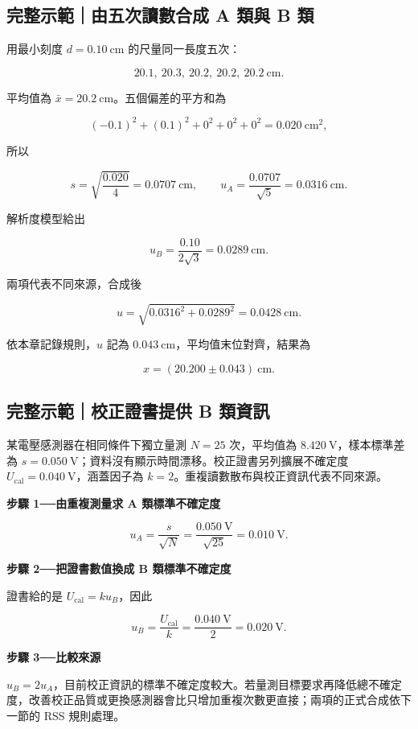 \documentclass[11pt,a4paper]{article}
\begin{document}
\begin{HandoutWorkedExample}

\subsection{完整示範｜由五次讀數合成 A 類與 B 類}\label{ux5b8cux6574ux793aux7bc4ux7531ux4e94ux6b21ux8b80ux6578ux5408ux6210-a-ux985eux8207-b-ux985e}

用最小刻度 \(d=0.10\ \mathrm{cm}\) 的尺量同一長度五次：

\[
20.1,\ 20.3,\ 20.2,\ 20.2,\ 20.2\ \mathrm{cm}.
\]

平均值為 \(\bar x=20.2\ \mathrm{cm}\)。五個偏差的平方和為

\[
(-0.1)^2+(0.1)^2+0^2+0^2+0^2=0.020\ \mathrm{cm^2},
\]

所以

\[
s=\sqrt{\frac{0.020}{4}}=0.0707\ \mathrm{cm},\qquad
u_A=\frac{0.0707}{\sqrt5}=0.0316\ \mathrm{cm}.
\]

解析度模型給出

\[
u_B=\frac{0.10}{2\sqrt3}=0.0289\ \mathrm{cm}.
\]

兩項代表不同來源，合成後

\[
u=\sqrt{0.0316^2+0.0289^2}=0.0428\ \mathrm{cm}.
\]

依本章記錄規則，\(u\) 記為 \(0.043\ \mathrm{cm}\)，平均值末位對齊，結果為

\[
\boxed{x=(20.200\pm0.043)\ \mathrm{cm}}.
\]

\end{HandoutWorkedExample}

\begin{HandoutWorkedExample}

\subsection{完整示範｜校正證書提供 B 類資訊}\label{ux5b8cux6574ux793aux7bc4ux6821ux6b63ux8b49ux66f8ux63d0ux4f9b-b-ux985eux8cc7ux8a0a}

某電壓感測器在相同條件下獨立量測 \(N=25\) 次，平均值為 \(8.420\ \mathrm V\)，樣本標準差為 \(s=0.050\ \mathrm V\)；資料沒有顯示時間漂移。校正證書另列擴展不確定度 \(U_{\mathrm{cal}}=0.040\ \mathrm V\)，涵蓋因子為 \(k=2\)。重複讀數散布與校正資訊代表不同來源。

\textbf{步驟 1──由重複測量求 A 類標準不確定度}

\[
u_A=\frac{s}{\sqrt N}
=\frac{0.050\ \mathrm V}{\sqrt{25}}
=0.010\ \mathrm V.
\]

\textbf{步驟 2──把證書數值換成 B 類標準不確定度}

證書給的是 \(U_{\mathrm{cal}}=k u_B\)，因此

\[
u_B=\frac{U_{\mathrm{cal}}}{k}
=\frac{0.040\ \mathrm V}{2}
=0.020\ \mathrm V.
\]

\textbf{步驟 3──比較來源}

\(u_B=2u_A\)，目前校正資訊的標準不確定度較大。若量測目標要求再降低總不確定度，改善校正品質或更換感測器會比只增加重複次數更直接；兩項的正式合成依下一節的 RSS 規則處理。

\end{HandoutWorkedExample}
\end{document}

